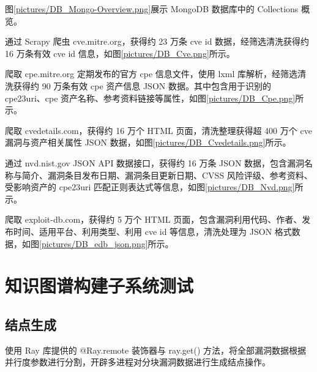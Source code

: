 \documentclass[a4paper,AutoFakeBold,oneside,12pt]{book}
\begin{document}
图\ref{pictures/DB_Mongo-Overview.png}展示 MongoDB 数据库中的 Collections 概览。


通过 Scrapy 爬虫 cve.mitre.org，获得约 23 万条 cve id 数据，经筛选清洗获得约 16 万条有效 cve id 信息，如图\ref{pictures/DB_Cve.png}所示。


爬取 cpe.mitre.org 定期发布的官方 cpe 信息文件，使用 lxml 库解析，经筛选清洗获得约 90 万条有效 cpe 资产信息 JSON 数据。其中包含用于识别的 cpe23uri、cpe 资产名称、参考资料链接等属性，如图\ref{pictures/DB_Cpe.png}所示。


爬取 cvedetails.com，获得约 16 万个 HTML 页面，清洗整理获得超 400 万个 cve 漏洞与资产相关属性 JSON 数据，如图\ref{pictures/DB_Cvedetails.png}所示。


通过 nvd.nist.gov JSON API 数据接口，获得约 16 万条 JSON 数据，包含漏洞名称与简介、漏洞条目发布日期、漏洞条目更新日期、CVSS 风险评级、参考资料、受影响资产的 cpe23uri 匹配正则表达式等信息，如图\ref{pictures/DB_Nvd.png}所示。


爬取 exploit-db.com，获得约 5 万个 HTML 页面，包含漏洞利用代码、作者、发布时间、适用平台、利用类型、利用 cve id 等信息，清洗处理为 JSON 格式数据，如图\ref{pictures/DB_edb_json.png}所示。


\section{知识图谱构建子系统测试}

\subsection{结点生成}

使用 Ray 库提供的 @Ray.remote 装饰器与 ray.get() 方法，将全部漏洞数据根据并行度参数进行分割，开辟多进程对分块漏洞数据进行生成结点操作。
\end{document}
